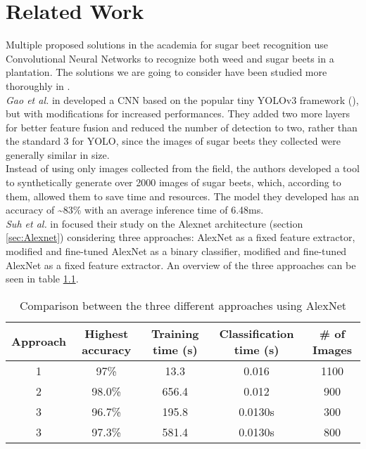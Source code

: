 \chapter{Related Work}
Multiple proposed solutions in the academia for sugar beet recognition use Convolutional Neural Networks to recognize both weed and sugar beets in a plantation. The solutions we are going to consider have been studied more thoroughly in \cite{project_work}. \\
\textit{Gao et al. } in \cite{gao_deep_2020} developed a CNN based on the popular tiny YOLOv3 framework (\cite{9074315}), but with modifications for increased performances. They added two more layers for better feature fusion and reduced the number of detection to two, rather than the standard 3 for YOLO, since the images of sugar beets they collected were generally similar in size.\\
Instead of using only images collected from the field, the authors developed a tool to synthetically generate over 2000 images of sugar beets, which, according to them, allowed them to save time and resources. The model they developed has an accuracy of \textasciitilde83\% with an average inference time of 6.48ms.\\
\textit{Suh et al.} in \cite{suh_transfer_2018} focused their study on the Alexnet architecture (section \ref{sec:Alexnet}) considering three approaches: AlexNet as a fixed feature extractor, modified and fine-tuned AlexNet as a binary classifier, modified and fine-tuned AlexNet as a fixed feature extractor. An overview of the three approaches can be seen in table \ref{tab:alexnet_comparison}. 
\begin{table}[h]
\begin{tabular}[h]{ c c  c c c}
\hline
Approach & Highest accuracy & Training time (s) & Classification time (s) &\# of Images\\
\hline
  1	&	97\%		& 	13.3		&	0.016	&	1100 \\
  2 	& 	98.0\% 	& 	656.4	&	0.012	&	900 \\
  3 	& 	96.7\% 	& 	195.8 	&	0.0130s 	& 	300\\
  3 	& 	97.3\% 	& 	581.4 	&	0.0130s 	& 	800\\

\end{tabular}

\caption[Comparison between the three different approaches using AlexNet]{Comparison between the three different approaches using AlexNet\cite{suh_transfer_2018}}
 \label{tab:alexnet_comparison}
\end{table}

